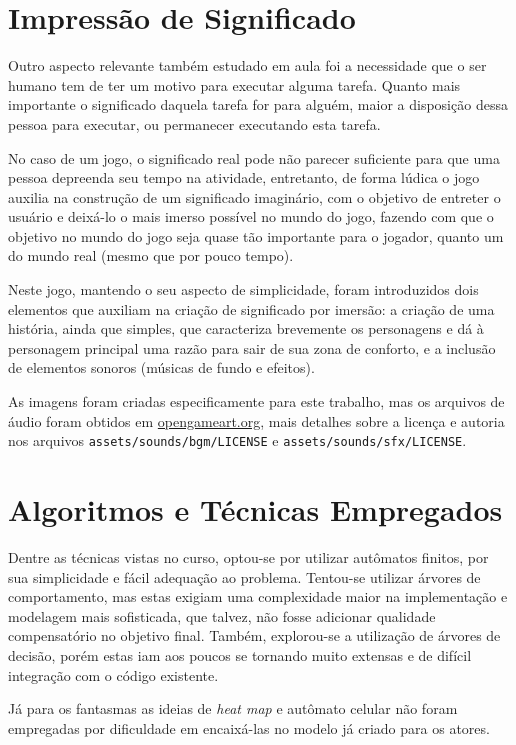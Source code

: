 \documentclass[a4paper]{scrartcl}
\begin{document}
\section{Impressão de Significado}

Outro aspecto relevante também estudado em aula foi a necessidade que o ser humano tem
de ter um motivo para executar alguma tarefa. Quanto mais importante o significado daquela
tarefa for para alguém, maior a disposição dessa pessoa para executar, ou permanecer executando 
esta tarefa.

No caso de um jogo, o significado real pode não parecer suficiente para que uma pessoa depreenda seu tempo
na atividade, entretanto, de forma lúdica o jogo auxilia na construção de um significado imaginário,
com o objetivo de entreter o usuário e deixá-lo o mais imerso possível no mundo do jogo, fazendo com que
o objetivo no mundo do jogo seja quase tão importante para o jogador, quanto um do mundo real (mesmo que por 
pouco tempo).

Neste jogo, mantendo o seu aspecto de simplicidade, foram introduzidos dois elementos
que auxiliam na criação de significado por imersão: a criação de uma história, ainda que simples,
que caracteriza brevemente os personagens e dá à personagem principal uma razão para sair de sua
zona de conforto, e a inclusão de elementos sonoros (músicas de fundo e efeitos).

As imagens foram criadas especificamente para este trabalho, mas os arquivos de áudio foram obtidos 
em \url{opengameart.org}, mais detalhes sobre a licença e autoria nos arquivos \texttt{assets/sounds/bgm/LICENSE} e \texttt{assets/sounds/sfx/LICENSE}.

\section{Algoritmos e Técnicas Empregados}

Dentre as técnicas vistas no curso, optou-se por utilizar autômatos finitos,
por sua simplicidade e fácil adequação ao problema. Tentou-se utilizar árvores de
comportamento, mas estas exigiam uma complexidade maior na implementação e modelagem mais
sofisticada, que talvez, não fosse adicionar qualidade compensatório no objetivo final.
Também, explorou-se a utilização de árvores de decisão, porém estas iam aos poucos se tornando
muito extensas e de difícil integração com o código existente.

Já para os fantasmas as ideias de \textit{heat map} e autômato celular não foram empregadas
por dificuldade em encaixá-las no modelo já criado para os atores.
\end{document}
